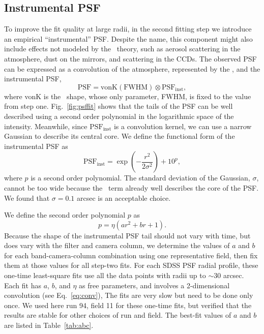 \subsection{Instrumental PSF \label{sec:instrPSF}} 

To improve the fit quality at large radii, in the second fitting step we introduce an
empirical ``instrumental'' PSF. Despite the name, this component might also include 
effects not modeled by the \vk~theory, such as aerosol scattering in the atmosphere,
dust on the mirrors, and scattering in the CCDs. The observed PSF can be expressed 
as a convolution of the atmosphere, represented 
by the \vk, and the instrumental PSF,
\begin{equation}
        \textrm{PSF} = \textrm{vonK} (\textrm{FWHM}) \otimes
        \textrm{PSF}_{\textrm{inst}},
\label{eq:conv}
\end{equation} 
where vonK is the \vk~shape, whose only parameter, FWHM, is fixed to
the value from step one.
Fig.~\ref{fig:psffit} shows that the tails of the PSF can be well
described using a second order polynomial in the logarithmic space of
the intensity.
Meanwhile, since $\textrm{PSF}_{\textrm{inst}}$ is a convolution
kernel, we can use a narrow Gaussian to describe its central core.
We define the functional form of the instrumental PSF as
\begin{equation}
        \textrm{PSF}_{\textrm{inst}} = \exp(-\frac{r^2}{2\sigma^2}) + 10^p,
\label{eq:psfinst}
\end{equation} 
where $p$ is a second order polynomial.
The standard deviation of the Gaussian, $\sigma$, cannot be
too wide because the \vk~term already well describes the core of the
PSF.
We found that $\sigma = 0.1$ arcsec is an acceptable choice.

We define the second order polynomial $p$ as
\begin{equation}
        p = \eta(ar^2+br+1).
\label{eq:psfinstp}
\end{equation} 
Because the shape of the instrumental PSF tail should not vary with
time, but does vary with the filter and camera column,
we determine the values of $a$ and $b$ for each band-camera-column
combination using one representative
field, then fix them at those values for all step-two fits.
For each SDSS PSF radial profile,
these one-time least-square fits use all the data points with radii up
to $\sim$30 arcsec.
Each fit has $a$, $b$, and $\eta$ as free parameters, and involves a 2-dimensional convolution (see Eq.~\ref{eq:conv}),
The fits are very slow but need to be done only once.
We used here run 94, field 11 for these one-time fits, but verified that 
the results are stable for other choices of run and field. 
The best-fit values of $a$ and $b$ are listed in Table~\ref{tab:abc}.

